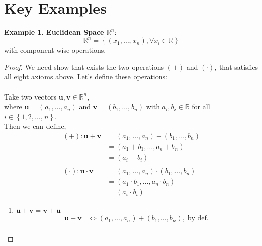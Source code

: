 \documentclass{article}
\theoremstyle{plain}
\theoremstyle{definition}
\newtheorem{example}{Example}[section]
\theoremstyle{remark}
\newcommand{\thmheader}[1]{%
  \textcolor{#1}{\normalfont\bfseries}%
}
\begin{document}
\section{Key Examples}
\begin{example}
\thmheader{excolor}\textbf{Euclidean Space $\mathbb{R}^n$}:
\[
\mathbb{R}^n = \left\{ (x_1, \hdots, x_n), \forall x_i \in \mathbb{R} \right\}
\]
with component-wise operations.
    \begin{proof}
        We need show that exists the two operations $(+)$ and $(\cdot)$, that satisfies all eight axioms above. Let's define these operations: \\
        \\
        Take two vectors $\mathbf{u}, \mathbf{v} \in \mathbb{R}^n$, \\
        where $\mathbf{u} = (a_1, \ldots, a_n)$ and $\mathbf{v} = (b_1, \ldots, b_n)$ with $a_i, b_i \in \mathbb{R}$ for all $i \in \left\{1, 2, \ldots, n \right\}$. \\
        Then we can define,\\
                \[
                \begin{aligned}
                    (+): \mathbf{u} + \mathbf{v} &= (a_1, \ldots, a_n) + (b_1, \ldots, b_n) \\
                                               &= (a_1 + b_1, \ldots, a_n + b_n) \\
                                               &= (a_i + b_i) \\
                                               \\
                    (\cdot): \mathbf{u} \cdot \mathbf{v} &= (a_1, \ldots, a_n) \cdot (b_1, \ldots, b_n) \\
                                                       &= (a_1 \cdot b_1, \ldots, a_n \cdot b_n) \\
                                                       &= (a_i \cdot b_i)
                \end{aligned}
                \]
        \begin{enumerate}[label=(V\arabic*),leftmargin=*]
            \item $\mathbf{u} + \mathbf{v} = \mathbf{v} + \mathbf{u}$ \\
                \[
                \begin{aligned}
                    \mathbf{u} + \mathbf{v} &\Leftrightarrow (a_1, \ldots, a_n) + (b_1, \ldots, b_n), \;\text{by def.}\; \\

\end{aligned}\]
\end{enumerate}
\end{proof}
\end{example}
\end{document}
